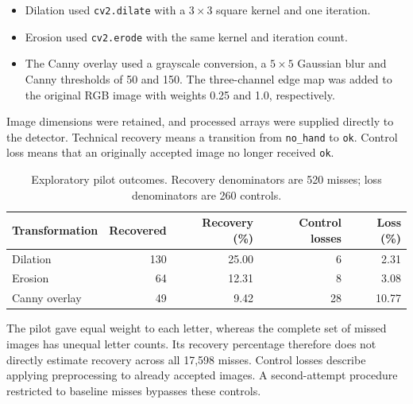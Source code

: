 \begin{itemize}
\item Dilation used \texttt{cv2.dilate} with a \(3\times3\) square kernel and one iteration.
\item Erosion used \texttt{cv2.erode} with the same kernel and iteration count.
\item The Canny overlay used a grayscale conversion, a \(5\times5\) Gaussian blur and Canny thresholds of 50 and 150. The three-channel edge map was added to the original RGB image with weights 0.25 and 1.0, respectively.
\end{itemize}

Image dimensions were retained, and processed arrays were supplied directly to the detector. Technical recovery means a transition from \texttt{no\_hand} to \texttt{ok}. Control loss means that an originally accepted image no longer received \texttt{ok}.

\begin{table}[ht]\centering
\caption{Exploratory pilot outcomes. Recovery denominators are 520 misses; loss denominators are 260 controls.}
\label{tab:rq2-pilot}
\begin{tabular}{lrrrr}\toprule
Transformation & Recovered & Recovery (\%) & Control losses & Loss (\%)\\\midrule
Dilation & 130 & 25.00 & 6 & 2.31\\
Erosion & 64 & 12.31 & 8 & 3.08\\
Canny overlay & 49 & 9.42 & 28 & 10.77\\\bottomrule
\end{tabular}
\end{table}

The pilot gave equal weight to each letter, whereas the complete set of missed images has unequal letter counts. Its recovery percentage therefore does not directly estimate recovery across all 17,598 misses. Control losses describe applying preprocessing to already accepted images. A second-attempt procedure restricted to baseline misses bypasses these controls.


